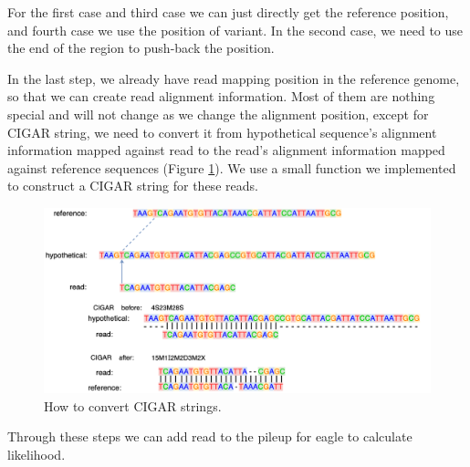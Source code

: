 For the first case and third case we can just directly get the reference position, and fourth case we use the position of variant.  In the second case, we need to use the end of the region to push-back the position.

In the last step, we already have read mapping position in the reference genome, so that we can create read alignment information. Most of them are nothing special and will not change as we change the alignment position, except for CIGAR string, we need to convert it from hypothetical sequence's alignment information mapped against read to the read's alignment information mapped against reference sequences (Figure \ref{convert-CIGAR}).  We use a small function we implemented to construct a CIGAR string for these reads.

\begin{figure}[H]
\includegraphics[width=1\columnwidth]{body/image/convert-CIGAR.png}
\caption[CIGAR strings]{How to convert CIGAR strings.}
\label{convert-CIGAR}
\end{figure}

Through these steps we can add read to the pileup for eagle to calculate likelihood.
